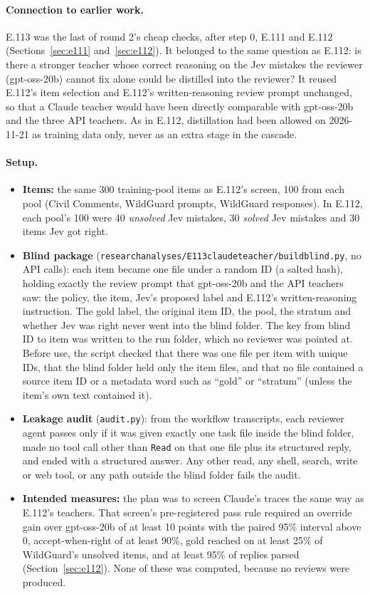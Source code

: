 \documentclass[11pt]{article}
\renewcommand{\_}{\origunderscore\allowbreak}
\begin{document}
\paragraph{Connection to earlier work.}
E.113 was the last of round 2's cheap checks, after step 0, E.111 and E.112 (Sections~\ref{sec:e111} and~\ref{sec:e112}). It belonged to the same question as E.112: is there a stronger teacher whose correct reasoning on the Jev mistakes the reviewer (gpt-oss-20b) cannot fix alone could be distilled into the reviewer? It reused E.112's item selection and E.112's written-reasoning review prompt unchanged, so that a Claude teacher would have been directly comparable with gpt-oss-20b and the three API teachers. As in E.112, distillation had been allowed on 2026-11-21 as training data only, never as an extra stage in the cascade.

\paragraph{Setup.}
\begin{itemize}[leftmargin=*]
  \item \textbf{Items:} the same 300 training-pool items as E.112's screen, 100 from each pool (Civil Comments, WildGuard prompts, WildGuard responses). In E.112, each pool's 100 were 40 \emph{unsolved} Jev mistakes, 30 \emph{solved} Jev mistakes and 30 items Jev got right.
  \item \textbf{Blind package} (\texttt{research\_analyses/E113\_claude\_teacher/build\_blind.py}, no API calls): each item became one file under a random ID (a salted hash), holding exactly the review prompt that gpt-oss-20b and the API teachers saw: the policy, the item, Jev's proposed label and E.112's written-reasoning instruction. The gold label, the original item ID, the pool, the stratum and whether Jev was right never went into the blind folder. The key from blind ID to item was written to the run folder, which no reviewer was pointed at. Before use, the script checked that there was one file per item with unique IDs, that the blind folder held only the item files, and that no file contained a source item ID or a metadata word such as ``gold'' or ``stratum'' (unless the item's own text contained it).
  \item \textbf{Leakage audit} (\texttt{audit.py}): from the workflow transcripts, each reviewer agent passes only if it was given exactly one task file inside the blind folder, made no tool call other than \texttt{Read} on that one file plus its structured reply, and ended with a structured answer. Any other read, any shell, search, write or web tool, or any path outside the blind folder fails the audit.
  \item \textbf{Intended measures:} the plan was to screen Claude's traces the same way as E.112's teachers. That screen's pre-registered pass rule required an override gain over gpt-oss-20b of at least 10 points with the paired 95\% interval above 0, accept-when-right of at least 90\%, gold reached on at least 25\% of WildGuard's unsolved items, and at least 95\% of replies parsed (Section~\ref{sec:e112}). None of these was computed, because no reviews were produced.
\end{itemize}
\end{document}
